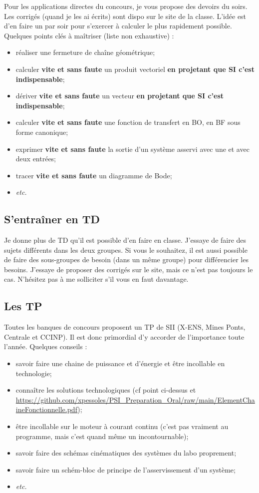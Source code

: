 Pour les applications directes du concours, je vous propose des devoirs du soirs. Les corrigés (quand je les ai écrits) sont dispo sur le site de la classe. L'idée est d'en faire un par soir pour s'exercer à calculer le plus rapidement possible. Quelques points clés à maîtriser (liste non exhaustive) : 
\begin{itemize}
\item réaliser une fermeture de chaîne géométrique;
\item calculer \textbf{vite et sans faute} un produit vectoriel \textbf{en projetant que SI c'est indispensable};
\item dériver \textbf{vite et sans faute} un vecteur \textbf{en projetant que SI c'est indispensable};
\item calculer \textbf{vite et sans faute} une fonction de transfert en BO, en BF sous forme canonique;
\item exprimer \textbf{vite et sans faute} la sortie d'un système asservi avec une et avec deux entrées;
\item tracer \textbf{vite et sans faute} un diagramme de Bode;
\item \textit{etc.}
\end{itemize}

\subsection{S'entraîner en TD}
Je donne plus de TD qu'il est possible d'en faire en classe. J'essaye de faire des sujets différents dans les deux groupes. Si vous le souhaitez, il est aussi possible de faire des sous-groupes de besoin (dans un même groupe) pour différencier les besoins.
J'essaye de proposer des corrigés sur le site, mais ce n'est pas toujours le cas. N'hésitez pas à me solliciter s'il vous en faut davantage. 

\subsection{Les TP}
Toutes les banques de concours proposent un TP de SII (X-ENS, Mines Ponts, Centrale et CCINP). 
Il est donc primordial d'y accorder de l'importance toute l'année. Quelques conseils :
\begin{itemize}
\item savoir faire une chaine de puissance et d'énergie et être incollable en technologie;
\item connaître les solutions technologiques (cf point ci-dessus et \url{https://github.com/xpessoles/PSI_Preparation_Oral/raw/main/ElementChaineFonctionnelle.pdf});
\item être incollable sur le moteur à courant continu (c'est pas vraiment au programme, mais c'est quand même un incontournable);
\item savoir faire des schémas cinématiques des systèmes du labo proprement;
\item savoir faire un schém-bloc de principe de l'asservissement d'un système;
\item \textit{etc.}
\end{itemize}

